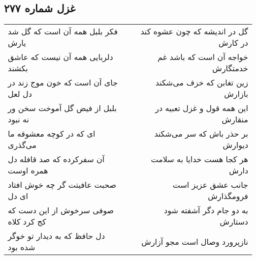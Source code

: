 \begin{center}
\section*{غزل شماره ۲۷۷}
\label{sec:sh277}
\begin{longtable}{l p{0.5cm} r}
فکر بلبل همه آن است که گل شد یارش
&&
گل در اندیشه که چون عشوه کند در کارش
\\
دلربایی همه آن نیست که عاشق بکشند
&&
خواجه آن است که باشد غم خدمتگارش
\\
جای آن است که خون موج زند در دل لعل
&&
زین تغابن که خزف می‌شکند بازارش
\\
بلبل از فیض گل آموخت سخن ور نه نبود
&&
این همه قول و غزل تعبیه در منقارش
\\
ای که در کوچه معشوقه ما می‌گذری
&&
بر حذر باش که سر می‌شکند دیوارش
\\
آن سفرکرده که صد قافله دل همره اوست
&&
هر کجا هست خدایا به سلامت دارش
\\
صحبت عافیتت گر چه خوش افتاد ای دل
&&
جانب عشق عزیز است فرومگذارش
\\
صوفی سرخوش از این دست که کج کرد کلاه
&&
به دو جام دگر آشفته شود دستارش
\\
دل حافظ که به دیدار تو خوگر شده بود
&&
نازپرورد وصال است مجو آزارش
\\
\end{longtable}
\end{center}
